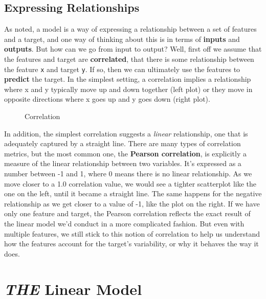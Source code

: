 \documentclass[
  letterpaper,
]{krantz}
\begin{document}
\subsection{Expressing Relationships}\label{sec-lm-relationships}

As noted, a model is a way of expressing a relationship between a set of
features and a target, and one way of thinking about this is in terms of
\textbf{inputs} and \textbf{outputs}. But how can we go from input to
output? Well, first off we assume that the features and target are
\textbf{correlated}, that there is some relationship between the feature
\texttt{x} and target \texttt{y}. If so, then we can ultimately use the
features to \textbf{predict} the target. In the simplest setting, a
correlation implies a relationship where x and y typically move up and
down together (left plot) or they move in opposite directions where x
goes up and y goes down (right plot).

\begin{figure}[H]


\caption{\label{fig-corr-plot}Correlation}

\end{figure}%

In addition, the simplest correlation suggests a \emph{linear}
relationship, one that is adequately captured by a straight line. There
are many types of correlation metrics, but the most common one, the
\textbf{Pearson correlation}, is explicitly a measure of the linear
relationship between two variables. It's expressed as a number between
-1 and 1, where 0 means there is no linear relationship. As we move
closer to a 1.0 correlation value, we would see a tighter scatterplot
like the one on the left, until it became a straight line. The same
happens for the negative relationship as we get closer to a value of -1,
like the plot on the right. If we have only one feature and target, the
Pearson correlation reflects the exact result of the linear model we'd
conduct in a more complicated fashion. But even with multiple features,
we still stick to this notion of correlation to help us understand how
the features account for the target's variability, or why it behaves the
way it does.

\section{\texorpdfstring{\emph{THE} Linear
Model}{THE Linear Model}}\label{sec-lm-linear-model}
\end{document}
